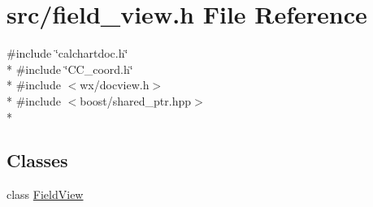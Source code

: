 \hypertarget{a00229}{\section{src/field\-\_\-view.h File Reference}
\label{a00229}
}
{\ttfamily \#include \char`\"{}calchartdoc.\-h\char`\"{}}\\*
{\ttfamily \#include \char`\"{}C\-C\-\_\-coord.\-h\char`\"{}}\\*
{\ttfamily \#include $<$wx/docview.\-h$>$}\\*
{\ttfamily \#include $<$boost/shared\-\_\-ptr.\-hpp$>$}\\*
\subsection*{Classes}
\begin{DoxyCompactItemize}
\item 
class \hyperlink{a00103}{Field\-View}
\end{DoxyCompactItemize}
